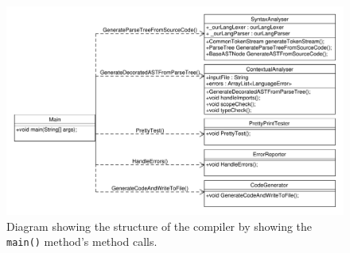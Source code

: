 \begin{figure}[t]
	\begin{sideways}
		\begin{minipage}{22.5cm}
			\includegraphics[height=0.42\textheight]{figures/ClassDiagrams/DiagramOfCallsFromMain.pdf}
		\end{minipage}
	\end{sideways}
	\centering
	\caption{Diagram showing the structure of the compiler by showing the \texttt{main()} method's method calls.}\label{fig:compilerOverview}
\end{figure}


%
%
%
%
%		
\clearpage

